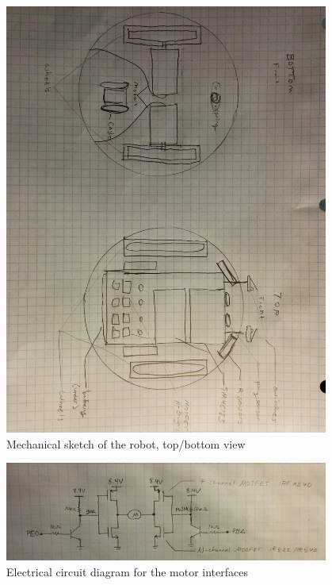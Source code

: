 \documentclass[12pt]{article}
\begin{document}
  \begin{figure}[b]
    \includegraphics[width=0.95\textwidth]{./img/mechanical-sketch-top-bottom.jpg}
    \caption{Mechanical sketch of the robot, top/bottom view}
    \label{fig:mechanical-sketch-top-bottom}
  \end{figure}
  \begin{figure}[b]
    \includegraphics[width=0.95\textwidth]{./img/h-bridge.png}
    \caption{Electrical circuit diagram for the motor interfaces}
    \label{fig:motor-interface}
  \end{figure}
\end{document}
